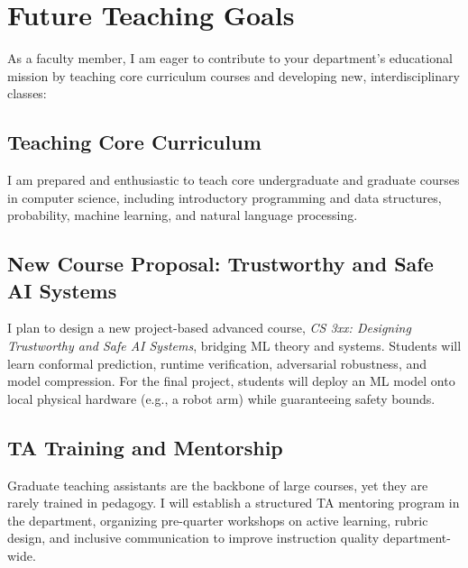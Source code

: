 \section{Future Teaching Goals}
As a faculty member, I am eager to contribute to your department's educational mission by teaching core curriculum courses and developing new, interdisciplinary classes:

\subsection{Teaching Core Curriculum}
I am prepared and enthusiastic to teach core undergraduate and graduate courses in computer science, including introductory programming and data structures, probability, machine learning, and natural language processing.

\subsection{New Course Proposal: Trustworthy and Safe AI Systems}
I plan to design a new project-based advanced course, \emph{CS 3xx: Designing Trustworthy and Safe AI Systems}, bridging ML theory and systems. Students will learn conformal prediction, runtime verification, adversarial robustness, and model compression. For the final project, students will deploy an ML model onto local physical hardware (e.g., a robot arm) while guaranteeing safety bounds.

\subsection{TA Training and Mentorship}
Graduate teaching assistants are the backbone of large courses, yet they are rarely trained in pedagogy. I will establish a structured TA mentoring program in the department, organizing pre-quarter workshops on active learning, rubric design, and inclusive communication to improve instruction quality department-wide.
